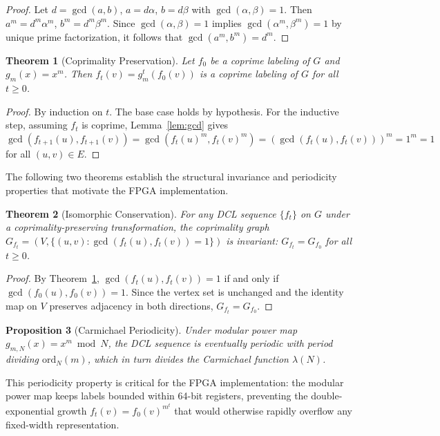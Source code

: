 \documentclass[lettersize,journal]{IEEEtran}
\newtheorem{theorem}{Theorem}
\newtheorem{proposition}[theorem]{Proposition}
\begin{document}
\begin{proof}
Let $d = \gcd(a,b)$, $a = d\alpha$, $b = d\beta$ with $\gcd(\alpha,\beta) = 1$. Then $a^m = d^m \alpha^m$, $b^m = d^m \beta^m$. Since $\gcd(\alpha,\beta) = 1$ implies $\gcd(\alpha^m, \beta^m) = 1$ by unique prime factorization, it follows that $\gcd(a^m, b^m) = d^m$.
\end{proof}

\begin{theorem}[Coprimality Preservation]
\label{thm:coprime}
Let $f_0$ be a coprime labeling of $G$ and $g_m(x) = x^m$. Then $f_t(v) = g_m^t(f_0(v))$ is a coprime labeling of $G$ for all $t \geq 0$.
\end{theorem}

\begin{proof}
By induction on $t$. The base case holds by hypothesis. For the inductive step, assuming $f_t$ is coprime, Lemma~\ref{lem:gcd} gives $\gcd(f_{t+1}(u), f_{t+1}(v)) = \gcd(f_t(u)^m, f_t(v)^m) = (\gcd(f_t(u), f_t(v)))^m = 1^m = 1$ for all $(u,v) \in E$.
\end{proof}

The following two theorems establish the structural invariance and periodicity properties that motivate the FPGA implementation.

\begin{theorem}[Isomorphic Conservation]
\label{thm:iso}
For any DCL sequence $\{f_t\}$ on $G$ under a coprimality-preserving transformation, the coprimality graph $G_{f_t} = (V, \{(u,v) : \gcd(f_t(u), f_t(v)) = 1\})$ is invariant: $G_{f_t} = G_{f_0}$ for all $t \geq 0$.
\end{theorem}

\begin{proof}
By Theorem~\ref{thm:coprime}, $\gcd(f_t(u), f_t(v)) = 1$ if and only if $\gcd(f_0(u), f_0(v)) = 1$. Since the vertex set is unchanged and the identity map on $V$ preserves adjacency in both directions, $G_{f_t} = G_{f_0}$.
\end{proof}

\begin{proposition}[Carmichael Periodicity]
\label{prop:carm}
Under modular power map $g_{m,N}(x) = x^m \bmod N$, the DCL sequence is eventually periodic with period dividing $\mathrm{ord}_N(m)$, which in turn divides the Carmichael function $\lambda(N)$.
\end{proposition}

This periodicity property is critical for the FPGA implementation: the modular power map keeps labels bounded within 64-bit registers, preventing the double-exponential growth $f_t(v) = f_0(v)^{m^t}$ that would otherwise rapidly overflow any fixed-width representation.
\end{document}
